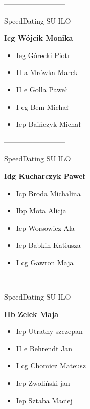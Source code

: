 \documentclass[a4paper,10pt]{article}
\begin{document}
\begin{multicols}{3}
\begin{minipage}[l]{\textwidth}
\begin{itemize}
    \end{itemize}



\end{minipage}



\begin{minipage}[l]{\textwidth}
--------------------------

  \footnotesize{SpeedDating SU ILO}

  \bfseries{Icg Wójcik Monika}

  \begin{itemize}
    \item Ieg Górecki Piotr
    \item II a Mrówka Marek
    \item II e Golla Paweł
    \item I eg Bem Michał
    \item Iep Baińczyk Michał

    \end{itemize}



\end{minipage}



\begin{minipage}[l]{\textwidth}
--------------------------

  \footnotesize{SpeedDating SU ILO}

  \bfseries{Idg Kucharczyk Paweł}

  \begin{itemize}
    \item Icp Broda Michalina
    \item Ibp Mota Alicja
    \item Icp Worsowicz Ala
    \item Iep Babkin Katiusza
    \item I cg Gawron Maja

    \end{itemize}



\end{minipage}



\begin{minipage}[l]{\textwidth}
--------------------------

  \footnotesize{SpeedDating SU ILO}

  \bfseries{IIb Zelek Maja}

  \begin{itemize}
    \item Iep Utratny szczepan
    \item II e Behrendt Jan
    \item I cg Chomicz Mateusz
    \item Iep Zwoliński jan
    \item Iep Sztaba Maciej


\end{itemize}
\end{minipage}
\end{multicols}
\end{document}
